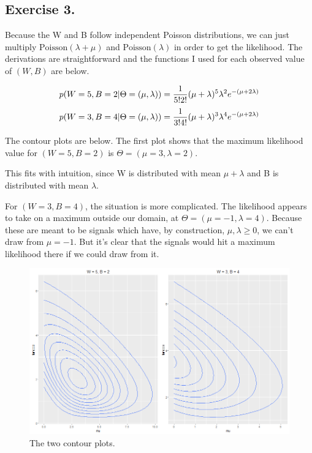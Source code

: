 \documentclass{article}
\begin{document}
\newpage

\subsection{Exercise 3.}

Because the W and B follow independent Poisson 
distributions, we can just multiply \(\text{Poisson}(\lambda + \mu)\) and 
\(\text{Poisson}(\lambda)\) in order to get the likelihood. The
derivations are straightforward and 
the functions I used for each observed value of \((W, B)\) are below.

\[p(W=5, B=2 \vert \Theta = (\mu, \lambda)) = 
{1 \over 5!2!} (\mu + \lambda)^5 {\lambda}^2 e^{-(\mu + 2\lambda)} \]
\[p(W=3, B=4 \vert \Theta = (\mu, \lambda)) = 
{1 \over 3!4!} (\mu + \lambda)^3 {\lambda}^4 e^{-(\mu + 2\lambda)} \]

The contour plots are below. The first plot shows that the maximum likelihood value
for \((W=5, B=2)\) is \(\Theta = (\mu = 3, \lambda = 2)\).

This fits with intuition, since W is distributed with mean
\(\mu + \lambda\) and B is distributed with mean \(\lambda\).

For \((W=3, B=4)\), the situation is more complicated.
The likelihood appears to take
on a maximum outside our domain, at \(\Theta = (\mu = -1, \lambda = 4)\).
Because these are meant to be signals which have, by construction, \(\mu, \lambda \geq 0\),
we can't draw from \(\mu = -1\). But it's clear that the signals would hit a maximum
likelihood there if we could draw from it.


\begin{figure}[!ht]
  \caption{The two contour plots.}
  \centering
    \includegraphics[width=\textwidth]{Question3}
\end{figure}
\end{document}

